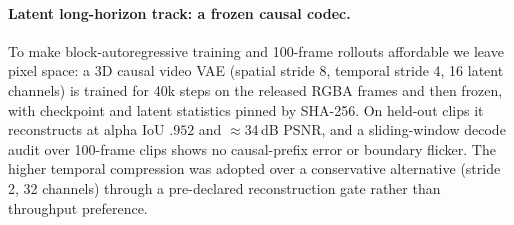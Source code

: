 \documentclass[10pt,twocolumn]{article}
\begin{document}
\paragraph{Latent long-horizon track: a frozen causal codec.} To make block-autoregressive training and 100-frame
rollouts affordable we leave pixel space: a 3D causal video VAE (spatial stride 8, temporal stride 4, 16 latent
channels) is trained for 40k steps on the released RGBA frames and then frozen, with checkpoint and latent statistics
pinned by SHA-256. On held-out clips it reconstructs at alpha IoU $.952$ and $\approx$34\,dB PSNR, and a sliding-window
decode audit over 100-frame clips shows no causal-prefix error or boundary flicker. The higher temporal compression was
adopted over a conservative alternative (stride 2, 32 channels) through a pre-declared reconstruction gate rather than
throughput preference.
\end{document}
